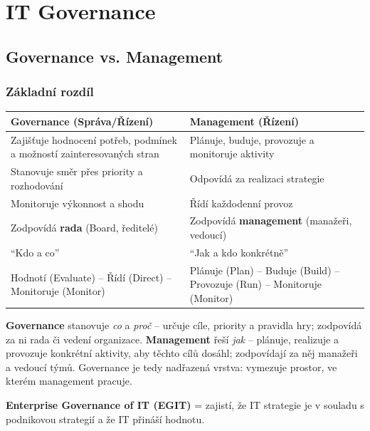 \section{IT Governance}

\subsection{Governance vs. Management}

\subsubsection{Základní rozdíl}

\begin{center}
\begin{tabular}{p{5.5cm}p{5.5cm}}
\toprule
\textbf{Governance (Správa/Řízení)} & \textbf{Management (Řízení)} \\
\midrule
Zajišťuje hodnocení potřeb, podmínek a možností zainteresovaných stran & Plánuje, buduje, provozuje a monitoruje aktivity \\
Stanovuje směr přes priority a rozhodování & Odpovídá za realizaci strategie \\
Monitoruje výkonnost a shodu & Řídí každodenní provoz \\
Zodpovídá \textbf{rada} (Board, ředitelé) & Zodpovídá \textbf{management} (manažeři, vedoucí) \\
``Kdo a co'' & ``Jak a kdo konkrétně'' \\
Hodnotí (Evaluate) -- Řídí (Direct) -- Monitoruje (Monitor) & Plánuje (Plan) -- Buduje (Build) -- Provozuje (Run) -- Monitoruje (Monitor) \\
\bottomrule
\end{tabular}
\end{center}

\textbf{Governance} stanovuje \textit{co} a \textit{proč} -- určuje cíle, priority a pravidla hry;
zodpovídá za ni rada či vedení organizace.
\textbf{Management} řeší \textit{jak} -- plánuje, realizuje a provozuje konkrétní aktivity, aby těchto cílů dosáhl;
zodpovídají za něj manažeři a vedoucí týmů.
Governance je tedy nadřazená vrstva: vymezuje prostor, ve kterém management pracuje.

\textbf{Enterprise Governance of IT (EGIT)} = zajistí, že IT strategie je v souladu s podnikovou strategií
a že IT přináší hodnotu.

